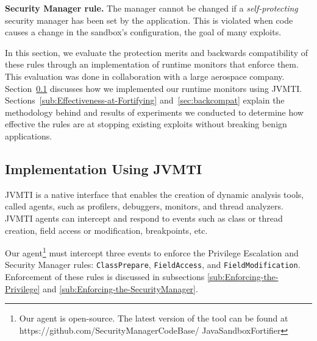 \documentclass{sig-alternate}
\begin{document}
\noindent \textbf{Security Manager rule.} The manager cannot
be changed if a \emph{self-protecting} security manager has been set
by the application. This is violated when code causes a change
in the sandbox's configuration, the goal of many exploits.



In this section, we evaluate the protection merits and backwards compatibility
of these rules through an implementation of runtime monitors that
enforce them. This evaluation was done in collaboration with a large aerospace
company.
Section~\ref{sub:Implementation-Using-JVMTI} discusses how we implemented
our runtime monitors using JVMTI. Sections~\ref{sub:Effectiveness-at-Fortifying} and~\ref{sec:backcompat} explain the methodology behind and results of experiments we conducted
to determine how effective the rules are at stopping existing exploits without
breaking benign applications. 

\subsection{Implementation Using JVMTI}\label{sub:Implementation-Using-JVMTI}

JVMTI is a native interface that enables the creation of
dynamic analysis tools, called agents, such as profilers, debuggers, monitors, and thread
analyzers. JVMTI agents can intercept and respond to events such as class
or thread creation, field access or modification, breakpoints, etc.

Our agent\footnote{Our agent is open-source. The latest version
of the tool can be found at https://github.com/SecurityManagerCodeBase/
JavaSandboxFortifier} must intercept three events to enforce the Privilege Escalation
and Security Manager rules: \texttt{ClassPrepare}, \texttt{FieldAccess},
and \texttt{FieldModification}. Enforcement of these rules is discussed in subsections \ref{sub:Enforcing-the-Privilege} and \ref{sub:Enforcing-the-SecurityManager}.
\end{document}

